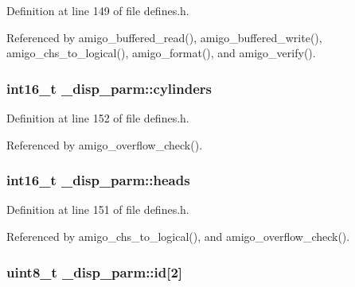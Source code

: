Definition at line 149 of file defines.\+h.



Referenced by amigo\+\_\+buffered\+\_\+read(), amigo\+\_\+buffered\+\_\+write(), amigo\+\_\+chs\+\_\+to\+\_\+logical(), amigo\+\_\+format(), and amigo\+\_\+verify().

\subsubsection[{\texorpdfstring{cylinders}{cylinders}}]{\setlength{\rightskip}{0pt plus 5cm}int16\+\_\+t \+\_\+disp\+\_\+parm\+::cylinders}\hypertarget{struct__disp__parm_ac4687d407f95a65e86313cde433832a4}{}\label{struct__disp__parm_ac4687d407f95a65e86313cde433832a4}


Definition at line 152 of file defines.\+h.



Referenced by amigo\+\_\+overflow\+\_\+check().

\subsubsection[{\texorpdfstring{heads}{heads}}]{\setlength{\rightskip}{0pt plus 5cm}int16\+\_\+t \+\_\+disp\+\_\+parm\+::heads}\hypertarget{struct__disp__parm_a013e3f25cec51e3edfae124ed5d22cb9}{}\label{struct__disp__parm_a013e3f25cec51e3edfae124ed5d22cb9}


Definition at line 151 of file defines.\+h.



Referenced by amigo\+\_\+chs\+\_\+to\+\_\+logical(), and amigo\+\_\+overflow\+\_\+check().

\subsubsection[{\texorpdfstring{id}{id}}]{\setlength{\rightskip}{0pt plus 5cm}uint8\+\_\+t \+\_\+disp\+\_\+parm\+::id\mbox{[}2\mbox{]}}\hypertarget{struct__disp__parm_adc781d8c48b2aa39c092fcb206f15e8c}{}\label{struct__disp__parm_adc781d8c48b2aa39c092fcb206f15e8c}


